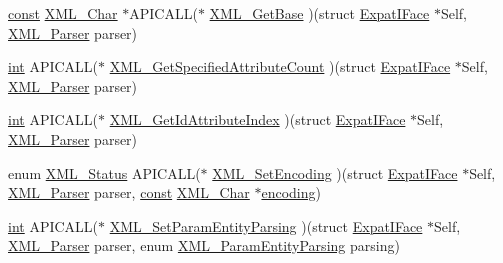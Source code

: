 \begin{DoxyCompactItemize}
\item 
\hyperlink{getopt1_8c_a2c212835823e3c54a8ab6d95c652660e}{const} \hyperlink{amiga_2include_2libraries_2expat_8h_a63da96463e775e1ec3a7d1f076208127}{X\+M\+L\+\_\+\+Char} $\ast$A\+P\+I\+C\+A\+LL($\ast$ \hyperlink{struct_expat_i_face_a0dc7b5c567360867f6efa0e1868390df}{X\+M\+L\+\_\+\+Get\+Base} )(struct \hyperlink{struct_expat_i_face}{Expat\+I\+Face} $\ast$Self, \hyperlink{amiga_2include_2libraries_2expat_8h_a9dc0003156857c67b3a60b3993846013}{X\+M\+L\+\_\+\+Parser} parser)
\item 
\hyperlink{xmltok_8h_a5a0d4a5641ce434f1d23533f2b2e6653}{int} A\+P\+I\+C\+A\+LL($\ast$ \hyperlink{struct_expat_i_face_a7b26f7dc79c56aea8491af2dc28430af}{X\+M\+L\+\_\+\+Get\+Specified\+Attribute\+Count} )(struct \hyperlink{struct_expat_i_face}{Expat\+I\+Face} $\ast$Self, \hyperlink{amiga_2include_2libraries_2expat_8h_a9dc0003156857c67b3a60b3993846013}{X\+M\+L\+\_\+\+Parser} parser)
\item 
\hyperlink{xmltok_8h_a5a0d4a5641ce434f1d23533f2b2e6653}{int} A\+P\+I\+C\+A\+LL($\ast$ \hyperlink{struct_expat_i_face_a389d90ac5a0468dd5245f846c5328616}{X\+M\+L\+\_\+\+Get\+Id\+Attribute\+Index} )(struct \hyperlink{struct_expat_i_face}{Expat\+I\+Face} $\ast$Self, \hyperlink{amiga_2include_2libraries_2expat_8h_a9dc0003156857c67b3a60b3993846013}{X\+M\+L\+\_\+\+Parser} parser)
\item 
enum \hyperlink{amiga_2include_2libraries_2expat_8h_aef71ca3ac8198499d56aaa7b474303bb}{X\+M\+L\+\_\+\+Status} A\+P\+I\+C\+A\+LL($\ast$ \hyperlink{struct_expat_i_face_ab9b60e4f109a9b50a2d9351787d5d0d3}{X\+M\+L\+\_\+\+Set\+Encoding} )(struct \hyperlink{struct_expat_i_face}{Expat\+I\+Face} $\ast$Self, \hyperlink{amiga_2include_2libraries_2expat_8h_a9dc0003156857c67b3a60b3993846013}{X\+M\+L\+\_\+\+Parser} parser, \hyperlink{getopt1_8c_a2c212835823e3c54a8ab6d95c652660e}{const} \hyperlink{amiga_2include_2libraries_2expat_8h_a63da96463e775e1ec3a7d1f076208127}{X\+M\+L\+\_\+\+Char} $\ast$\hyperlink{structencoding}{encoding})
\item 
\hyperlink{xmltok_8h_a5a0d4a5641ce434f1d23533f2b2e6653}{int} A\+P\+I\+C\+A\+LL($\ast$ \hyperlink{struct_expat_i_face_a948e23be16ea247e2f0f0b5c095b96d4}{X\+M\+L\+\_\+\+Set\+Param\+Entity\+Parsing} )(struct \hyperlink{struct_expat_i_face}{Expat\+I\+Face} $\ast$Self, \hyperlink{amiga_2include_2libraries_2expat_8h_a9dc0003156857c67b3a60b3993846013}{X\+M\+L\+\_\+\+Parser} parser, enum \hyperlink{amiga_2include_2libraries_2expat_8h_a83ffd61320d59d0c6c33dfcf1a0c098f}{X\+M\+L\+\_\+\+Param\+Entity\+Parsing} parsing)

\end{DoxyCompactItemize}

